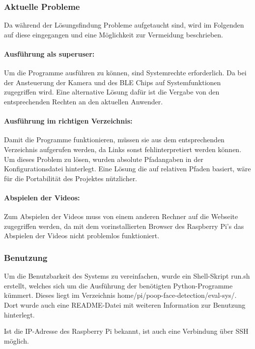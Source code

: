\subsubsection{Aktuelle Probleme}
\label{subsubsec:software_problems}

Da während der Lösungsfindung Probleme aufgetaucht sind, wird im Folgenden auf diese eingegangen und eine Möglichkeit zur Vermeidung beschrieben.

\paragraph{Ausführung als superuser:} Um die Programme ausführen zu können, sind Systemrechte erforderlich. Da bei der Ansteuerung der Kamera und des BLE Chips auf Systemfunktionen zugegriffen wird. Eine alternative Lösung dafür ist die Vergabe von den entsprechenden Rechten an den aktuellen Anwender.

\paragraph{Ausführung im richtigen Verzeichnis:} Damit die Programme funktionieren, müssen sie aus dem entsprechenden Verzeichnis aufgerufen werden, da Links sonst fehlinterpretiert werden können. Um dieses Problem zu lösen, wurden absolute Pfadangaben in der Konfigurationsdatei hinterlegt. Eine Lösung die auf relativen Pfaden basiert, wäre für die Portabilität des Projektes nützlicher.

\paragraph{Abspielen der Videos:} Zum Abspielen der Videos muss von einem anderen Rechner auf die Webseite zugegriffen werden, da mit dem vorinstallierten Browser des Raspberry Pi's das Abspielen der Videos nicht problemlos funktioniert. 

\subsubsection{Benutzung}
\label{subsubsec:using}

Um die Benutzbarkeit des Systems zu vereinfachen, wurde ein Shell-Skript run.sh erstellt, welches sich um die Ausführung der benötigten Python-Programme kümmert. Dieses liegt im Verzeichnis home/pi/poop-face-detection/eval-sys/. Dort wurde auch eine README-Datei mit weiteren Information zur Benutzung hinterlegt.

Ist die IP-Adresse des Raspberry Pi bekannt, ist auch eine Verbindung über SSH möglich.
